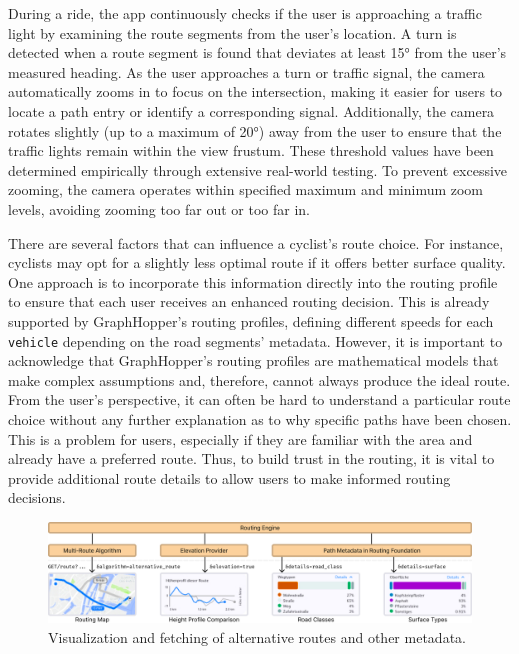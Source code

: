 During a ride, the app continuously checks if the user is approaching a traffic light by examining the route segments from the user's location. A turn is detected when a route segment is found that deviates at least 15° from the user's measured heading. As the user approaches a turn or traffic signal, the camera automatically zooms in to focus on the intersection, making it easier for users to locate a path entry or identify a corresponding signal. Additionally, the camera rotates slightly (up to a maximum of 20°) away from the user to ensure that the traffic lights remain within the view frustum. These threshold values have been determined empirically through extensive real-world testing. To prevent excessive zooming, the camera operates within specified maximum and minimum zoom levels, avoiding zooming too far out or too far in.

There are several factors that can influence a cyclist's route choice. For instance, cyclists may opt for a slightly less optimal route if it offers better surface quality. One approach is to incorporate this information directly into the routing profile to ensure that each user receives an enhanced routing decision. This is already supported by GraphHopper's routing profiles, defining different speeds for each \texttt{vehicle} depending on the road segments' metadata. However, it is important to acknowledge that GraphHopper's routing profiles are mathematical models that make complex assumptions and, therefore, cannot always produce the ideal route. From the user's perspective, it can often be hard to understand a particular route choice without any further explanation as to why specific paths have been chosen. This is a problem for users, especially if they are familiar with the area and already have a preferred route. Thus, to build trust in the routing, it is vital to provide additional route details to allow users to make informed routing decisions.

\begin{figure}[htbp]
\centering
\includegraphics[width=\linewidth]{images/graphhopper-data-flow.png}
\caption{Visualization and fetching of alternative routes and other metadata.}
\label{fig:graphhopper-data-flow}
\end{figure}

